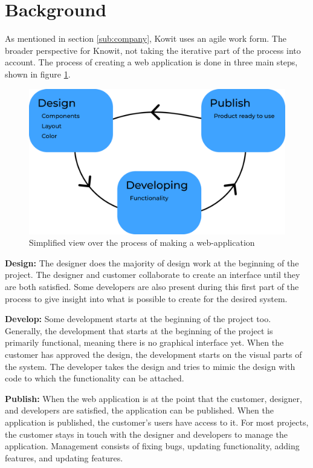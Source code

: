 \newpage
\section{Background}
As mentioned in section \ref{sub:company}, Kowit uses an agile work form. The broader perspective for Knowit, not taking the iterative part of the process into account. The process of creating a web application is done in three main steps, shown in figure \ref{fig:ddp}. 

\begin{figure}[H]
  \centering
  \includegraphics[width=0.8\linewidth]{images/ddp.png}
  \caption{Simplified view over the process of making a web-application}%
  \label{fig:ddp}
\end{figure}


\textbf{Design:} The designer does the majority of design work at the beginning of the project. The designer and customer collaborate to create an interface until they are both satisfied.  Some developers are also present during this first part of the process to give insight into what is possible to create for the desired system.

\textbf{Develop:} Some development starts at the beginning of the project too. Generally, the development that starts at the beginning of the project is primarily functional, meaning there is no graphical interface yet. When the customer has approved the design, the development starts on the visual parts of the system. The developer takes the design and tries to mimic the design with code to which the functionality can be attached.  

\textbf{Publish:} When the web application is at the point that the customer, designer, and developers are satisfied, the application can be published. When the application is published, the customer's users have access to it. For most projects, the customer stays in touch with the designer and developers to manage the application. Management consists of fixing bugs, updating functionality, adding features, and updating features.

